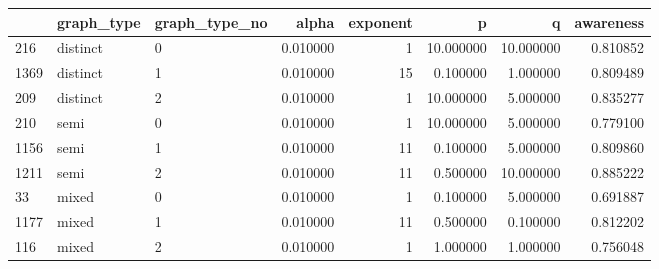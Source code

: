 \begin{tabular}{lllrrrrr}
\toprule
 & graph_type & graph_type_no & alpha & exponent & p & q & awareness \\
\midrule
216 & distinct & 0 & 0.010000 & 1 & 10.000000 & 10.000000 & 0.810852 \\
1369 & distinct & 1 & 0.010000 & 15 & 0.100000 & 1.000000 & 0.809489 \\
209 & distinct & 2 & 0.010000 & 1 & 10.000000 & 5.000000 & 0.835277 \\
210 & semi & 0 & 0.010000 & 1 & 10.000000 & 5.000000 & 0.779100 \\
1156 & semi & 1 & 0.010000 & 11 & 0.100000 & 5.000000 & 0.809860 \\
1211 & semi & 2 & 0.010000 & 11 & 0.500000 & 10.000000 & 0.885222 \\
33 & mixed & 0 & 0.010000 & 1 & 0.100000 & 5.000000 & 0.691887 \\
1177 & mixed & 1 & 0.010000 & 11 & 0.500000 & 0.100000 & 0.812202 \\
116 & mixed & 2 & 0.010000 & 1 & 1.000000 & 1.000000 & 0.756048 \\
\bottomrule
\end{tabular}
